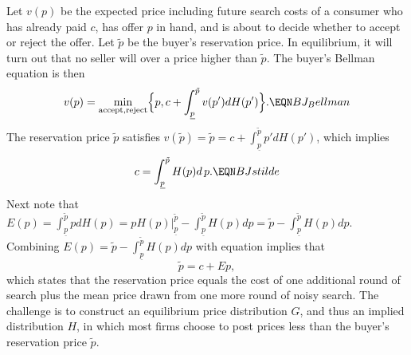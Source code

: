 Let $v(p)$ be the expected price including future search costs of a consumer who has already paid $c$, has offer $p$ in hand, and is
about to decide whether to accept or reject the offer. Let $\tilde p$ be  the buyer's reservation price. In equilibrium, it will turn out
that no seller will over a price higher than $\tilde p$.   The buyer's Bellman equation is then
$$ v(p) = \min_{\rm accept, reject} \Bigl\{ p, c + \int_{\underline p}^{\tilde p} v(p') d H (p')    \Bigr\} . \EQN BJ_Bellman $$
The reservation price $\tilde p$ satisfies $v(\tilde p) = \tilde p = c + \int_{\underline p}^{\tilde p} p' d H(p') $,
which implies
$$ c = \int_{\underline p}^{\tilde p}  H(p) d \, p .  \EQN BJstilde $$
Next note that $E(p) = \int_{\underline p}^{\tilde p} p d H(p) = p H(p)|_{\underline p}^{\tilde p} - \int_{\underline p}^{\tilde p} H(p) d p  = \tilde p -
\int_{\underline p}^{\tilde p} H(p) d p$. Combining
$E(p) = \tilde p -\int_{\underline p}^{\tilde p} H(p) d p $ with equation  implies that
$$ \tilde p = c + E p, $$
which states that the reservation price equals the cost of one additional round of  search plus the mean  price drawn from  one more round of noisy search.
The challenge is to construct an equilibrium price distribution $G$, and thus an implied distribution $H$,
in which most firms choose to post prices less than the buyer's reservation price $\tilde p$.
